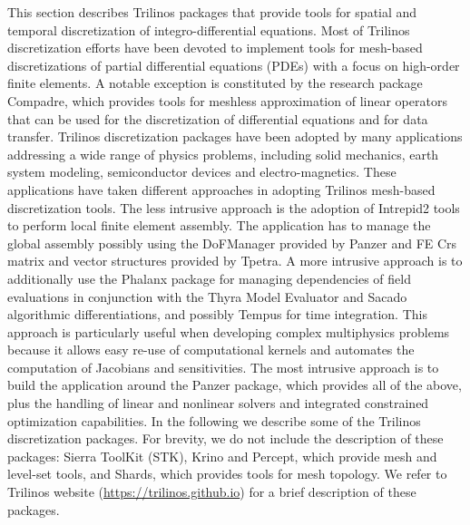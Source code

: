 
This section describes Trilinos packages that provide tools for spatial and temporal discretization of integro-differential equations. Most of Trilinos discretization efforts have been devoted to implement tools for mesh-based discretizations of partial differential equations (PDEs) with a focus on high-order finite elements. A notable exception is constituted by the research package Compadre, which provides tools for meshless approximation of linear operators that can be used for the discretization of differential equations and for data transfer.
Trilinos discretization packages have been adopted by many applications addressing a wide range of physics problems, including solid mechanics, earth system modeling, semiconductor devices and electro-magnetics. These applications have taken different approaches in adopting Trilinos mesh-based discretization tools. The less intrusive approach is the adoption of Intrepid2 tools to perform local finite element assembly. The application has to manage the global assembly possibly using the DoFManager provided by Panzer and FE Crs matrix and vector structures provided by Tpetra.  
A more intrusive approach is to additionally use the Phalanx package for managing dependencies of field evaluations in conjunction with the Thyra Model Evaluator and Sacado algorithmic differentiations, and possibly Tempus for time integration. This approach is particularly useful when developing complex multiphysics problems because it allows easy re-use of computational kernels and automates the computation of Jacobians and sensitivities.
The most intrusive approach is to build the application around the Panzer package, which provides all of the above, plus the handling of linear and nonlinear solvers and integrated constrained optimization capabilities.
In the following we describe some of the Trilinos discretization packages. For brevity, we do not include the description of these packages: Sierra ToolKit (STK), Krino and Percept, which provide mesh and level-set tools, and Shards, which provides tools for mesh topology. We refer to Trilinos website (\url{https://trilinos.github.io}) for a brief description of these packages.



